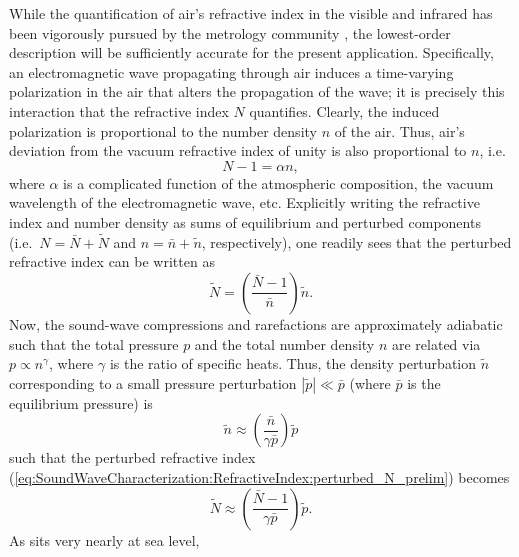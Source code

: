 While the quantification of air's refractive index
in the visible and infrared
has been vigorously pursued by the metrology community
\cite{young_refractivity_of_air, stone_index_of_refraction_of_air,
marchetti_ipt06, mathar_N_IR_07},
the lowest-order description will be sufficiently accurate
for the present application.
Specifically, an electromagnetic wave propagating through air
induces a time-varying polarization in the air
that alters the propagation of the wave;
it is precisely this interaction
that the refractive index $N$ quantifies.
Clearly, the induced polarization is
proportional to the number density $n$ of the air.
Thus, air's deviation from the vacuum refractive index of unity
is also proportional to $n$, i.e.\
\begin{equation}
  N - 1 = \alpha n,
  \label{eq:SoundWaveCharacterization:RefractiveIndex:deviation_from_vacuum}
\end{equation}
where $\alpha$ is a complicated function of
the atmospheric composition,
the vacuum wavelength of the electromagnetic wave, etc.
Explicitly writing the refractive index and number density
as sums of equilibrium and perturbed components
(i.e.\ $N = \bar{N} + \tilde{N}$ and
$n = \bar{n} + \tilde{n}$, respectively),
one readily sees that the perturbed refractive index can be written as
\begin{equation}
  \tilde{N}
  =
  \left( \frac{\bar{N} - 1}{\bar{n}} \right)
  \tilde{n}
  \label{eq:SoundWaveCharacterization:RefractiveIndex:perturbed_N_prelim}.
\end{equation}
Now, the sound-wave compressions and rarefactions
are approximately adiabatic such that
the total pressure $p$ and the total number density $n$ are related via
$p \propto n^{\gamma}$, where $\gamma$ is the ratio of specific heats.
Thus, the density perturbation $\tilde{n}$
corresponding to a small pressure perturbation $|\tilde{p}| \ll \bar{p}$
(where $\bar{p}$ is the equilibrium pressure) is
\begin{equation}
  \tilde{n}
  \approx
  \left( \frac{\bar{n}}{\gamma \bar{p}} \right)
  \tilde{p}
\end{equation}
such that the perturbed refractive index
(\ref{eq:SoundWaveCharacterization:RefractiveIndex:perturbed_N_prelim})
becomes
\begin{equation}
  \tilde{N}
  \approx
  \left( \frac{\bar{N} - 1}{\gamma \bar{p}} \right)
  \tilde{p}.
  \label{eq:SoundWaveCharacterization:RefractiveIndex:perturbed_N}
\end{equation}
As \diiid\space sits very nearly at sea level,
